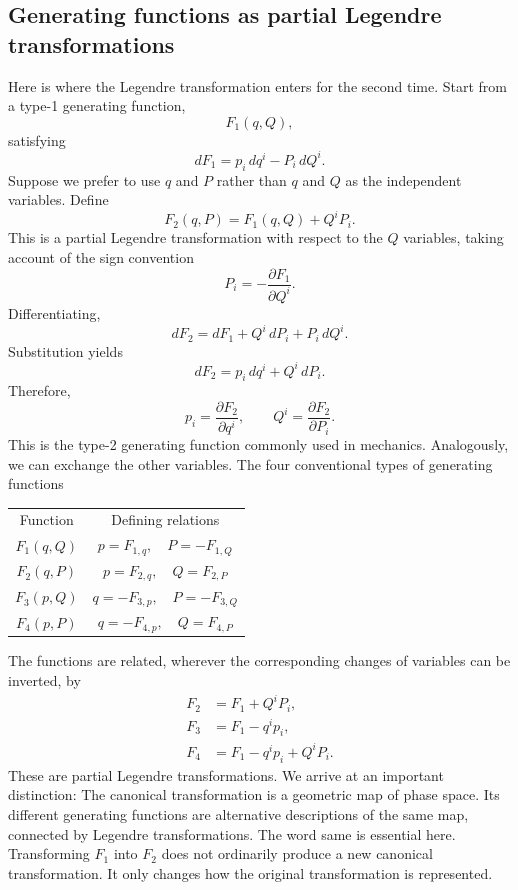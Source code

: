 \subsection{Generating functions as partial Legendre transformations}
Here is where the Legendre transformation enters for the second time.
Start from a type-1 generating function,
\[
F_1(q,Q),
\]
satisfying
\[
dF_1=p_i\,dq^i-P_i\,dQ^i.
\]
Suppose we prefer to use \(q\) and \(P\) rather than \(q\) and \(Q\) as the
independent variables.
Define
\[
\boxed{
F_2(q,P)=F_1(q,Q)+Q^iP_i.
}
\]
This is a partial Legendre transformation with respect to the \(Q\) variables,
taking account of the sign convention
\[
P_i=-\frac{\partial F_1}{\partial Q^i}.
\]
Differentiating,
\[
dF_2
=dF_1+Q^i\,dP_i+P_i\,dQ^i.
\]
Substitution yields
\[
dF_2=p_i\,dq^i+Q^i\,dP_i.
\]
Therefore,
\[
\boxed{
p_i=\frac{\partial F_2}{\partial q^i},
\qquad
Q^i=\frac{\partial F_2}{\partial P_i}.
}
\]
This is the type-2 generating function commonly used in mechanics.
Analogously, we can exchange the other variables.
The four conventional types of generating functions

\noindent
\begin{tabular}{cc}
    Function&	Defining relations\\
    \(F_1(q,Q)\)&	\(p=F_{1,q},\quad P=-F_{1,Q}\)\\
    \(F_2(q,P)\)&	\(p=F_{2,q},\quad Q=F_{2,P}\)\\
    \(F_3(p,Q)\)&	\(q=-F_{3,p},\quad P=-F_{3,Q}\)\\
    \(F_4(p,P)\)&	\(q=-F_{4,p},\quad Q=F_{4,P}\)\\
\end{tabular}

The functions are related, wherever the corresponding changes of variables can
be inverted, by
\[
\begin{aligned}
F_2&=F_1+Q^iP_i,\\
F_3&=F_1-q^ip_i,\\
F_4&=F_1-q^ip_i+Q^iP_i.
\end{aligned}
\]
These are partial Legendre transformations.
We arrive at an important distinction:
The canonical transformation is a geometric map of phase space. Its different
generating functions are alternative descriptions of the same map, connected by
Legendre transformations.
The word same is essential here. Transforming \(F_1\) into \(F_2\) does not
ordinarily produce a new canonical transformation.
It only changes how the original transformation is represented.

